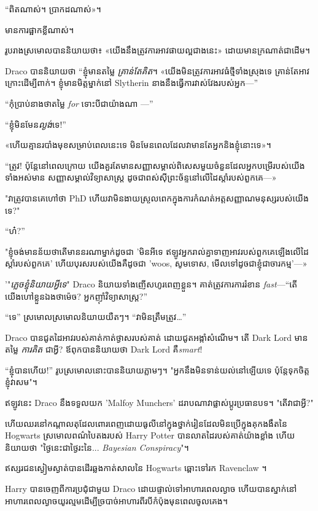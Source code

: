 {{{“ពិតណាស់។ ប្រាកដ​ណាស់»។

មានការផ្អាកខ្លីណាស់។

រូប​រាង​ស្រមោល​បាន​និយាយ​ថា​៖ «​យើង​នឹង​ត្រូវ​ការ​អាវ​ផាយ​ល្អ​ជាង​នេះ​» ដោយ​មាន​ក្រណាត់​ជាដើម។

Draco បាននិយាយថា “ខ្ញុំមានតម្លៃ \emph{គ្រាន់តែគិត}។ «យើង​មិន​ត្រូវ​ការ​អាវ​ធំ​ថ្មី​ទាំង​ស្រុង​ទេ គ្រាន់​តែ​អាវ​ក្រោះ​ដើម្បី​ពាក់។ ខ្ញុំមានមិត្តម្នាក់នៅ Slytherin នាងនឹងធ្វើការវាស់វែងរបស់អ្នក—”

“កុំប្រាប់នាងថាតម្លៃ \emph{for} ទោះបីជាយ៉ាងណា —”

“ខ្ញុំមិនមែន\emph{ល្ងង់}ទេ!”

«ហើយ​គ្មាន​របាំង​មុខ​សម្រាប់​ពេល​នេះ​ទេ មិនមែន​ពេល​ដែល​វា​មាន​តែ​អ្នក​និង​ខ្ញុំ​នោះ​ទេ»។

“ត្រូវ! ប៉ុន្តែនៅពេលក្រោយ យើងគួរតែមានសញ្ញាសម្គាល់ពិសេសមួយចំនួនដែលអ្នកបម្រើរបស់យើងទាំងអស់មាន សញ្ញាសម្គាល់វិទ្យាសាស្រ្ត ដូចជាពស់ស៊ីព្រះច័ន្ទនៅលើដៃស្តាំរបស់ពួកគេ—»

"វាត្រូវបានគេហៅថា PhD ហើយវាមិនងាយស្រួលពេកក្នុងការកំណត់អត្តសញ្ញាណមនុស្សរបស់យើងទេ?"

“ហ៎?”

"ខ្ញុំ​ចង់​មាន​ន័យ​ថា​តើ​មាន​នរណា​ម្នាក់​ដូច​ជា 'មិន​អី​ទេ ឥឡូវ​អ្នក​រាល់​គ្នា​ទាញ​អាវ​របស់​ពួក​គេ​ឡើង​លើ​ដៃ​ស្តាំ​របស់​ពួក​គេ' ហើយ​បុរស​របស់​យើង​គឺ​ដូច​ជា 'woos, សូម​ទោស, មើល​ទៅ​ដូច​ជា​ខ្ញុំ​ជា​ចារកម្ម'—»

'"\emph{ភ្លេចខ្ញុំនិយាយអ្វីទេ}" Draco និយាយទាំងញើសហូរពេញខ្លួន។ គាត់ត្រូវការការរំខាន \emph{fast}—“តើយើងហៅខ្លួនឯងថាម៉េច? អ្នកញ៉ាំវិទ្យាសាស្ត្រ?”

“ទេ” ស្រមោលស្រមោលនិយាយយឺតៗ។ “វា​មិន​ត្រឹម​ត្រូវ…”

Draco បាន​ជូត​ដៃ​អាវ​របស់​គាត់​កាត់​ថ្ងាស​របស់​គាត់ ដោយ​ជូត​អង្កាំ​សំណើម។ តើ Dark Lord មានតម្លៃ \emph{ការគិត} ជាអ្វី? ឪពុកបាននិយាយថា Dark Lord គឺ\emph{smart}!

“ខ្ញុំ​បាន​ហើយ!” រូប​ស្រមោល​នោះ​បាន​និយាយ​ភ្លាមៗ។ "អ្នក​នឹង​មិន​ទាន់​យល់​នៅ​ឡើយ​ទេ ប៉ុន្តែ​ទុក​ចិត្ត​ខ្ញុំ​វា​សម"។

ឥឡូវនេះ Draco នឹងទទួលយក 'Malfoy Munchers' ដរាបណាវាផ្លាស់ប្តូរប្រធានបទ។ "តើវាជាអ្វី?"

ហើយឈរនៅកណ្តាលតុដែលពោរពេញដោយធូលីនៅក្នុងថ្នាក់រៀនដែលមិនប្រើក្នុងគុកងងឹតនៃ Hogwarts ស្រមោលពណ៌បៃតងរបស់ Harry Potter បានលាតដៃរបស់គាត់យ៉ាងខ្លាំង ហើយនិយាយថា "ថ្ងៃនេះជាថ្ងៃរះនៃ... \emph{Bayesian Conspiracy}"។

\later

ឥស្សរជនស្ងៀមស្ងាត់បានដើរឆ្លងកាត់សាលនៃ Hogwarts ឆ្ពោះទៅរក Ravenclaw ។

Harry បានចេញពីការប្រជុំជាមួយ Draco ដោយផ្ទាល់ទៅអាហារពេលល្ងាច ហើយបានស្នាក់នៅអាហារពេលល្ងាចយូរល្មមដើម្បីច្របាច់អាហារពីរបីកំប៉ុងមុនពេលចូលគេង។

}}}
